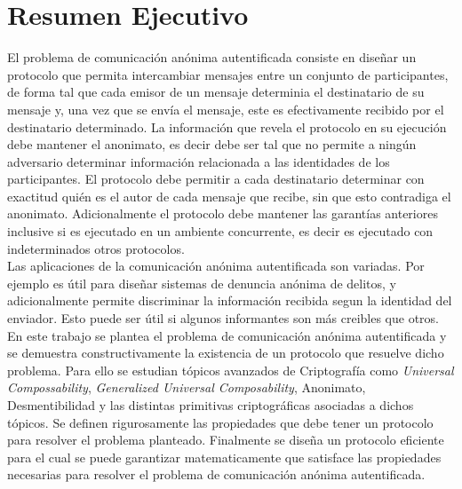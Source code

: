 \section{Resumen Ejecutivo}

El problema de comunicación anónima autentificada consiste en diseñar un protocolo
que permita intercambiar mensajes entre un conjunto de participantes, de forma tal
que cada emisor de un mensaje determinia el destinatario de su
mensaje y, una vez que se envía el mensaje,  este es efectivamente recibido por el destinatario
determinado. La información que revela el protocolo en su ejecución debe mantener el
anonimato, es decir debe ser tal que no permite a ningún adversario determinar 
información relacionada a las identidades  de los participantes.
El protocolo debe permitir a cada destinatario determinar con exactitud quién es el autor
de cada mensaje que recibe, sin que esto contradiga el anonimato.
Adicionalmente el protocolo debe mantener las garantías anteriores inclusive si es ejecutado en
un ambiente concurrente, es decir es ejecutado con indeterminados otros protocolos.\\
Las aplicaciones de la comunicación anónima autentificada son variadas. Por ejemplo es útil
para diseñar sistemas de denuncia anónima de delitos, y adicionalmente permite discriminar
la información recibida segun la identidad del enviador. Esto puede ser útil si algunos
informantes son más creibles que otros.\\
En este trabajo se plantea el problema de comunicación anónima autentificada y se
demuestra constructivamente la existencia de un protocolo que resuelve dicho problema.
Para ello se estudian tópicos avanzados de Criptografía como \textit{Universal
Compossability}, \textit{Generalized Universal Composability}, Anonimato,
Desmentibilidad y las distintas primitivas criptográficas asociadas a dichos tópicos.
Se definen rigurosamente las propiedades que debe tener un protocolo para
resolver el problema planteado.
Finalmente se diseña un protocolo eficiente para el cual se puede garantizar
matematicamente que satisface las propiedades necesarias para resolver el problema
de comunicación anónima autentificada.

